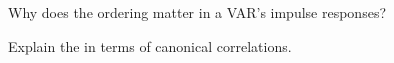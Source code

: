 \begin{interviewq}\label{iq:qm:multivariate-series-and-cointegration:5}
Why does the ordering matter in a VAR's impulse responses?
\end{interviewq}

\begin{interviewq}\label{iq:qm:multivariate-series-and-cointegration:6}
Explain the  in terms of canonical correlations.
\end{interviewq}
